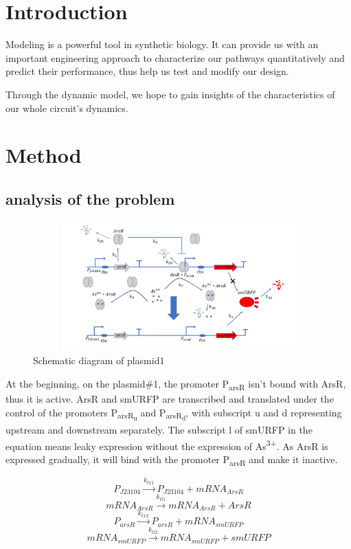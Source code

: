 \section{Introduction}
Modeling is a powerful tool in synthetic biology. It can provide us with an important engineering approach to characterize our pathways quantitatively and predict their performance, thus help us test and modify our design.

Through the dynamic model, we hope to gain insights of the characteristics of our whole circuit's dynamics.

\section{Method}
\subsection{analysis of the problem}
\begin{figure}[h]
\centering
\includegraphics[width=12cm,height=5cm]{1}
\caption{Schematic diagram of plasmid1}
\end{figure}

At the beginning, on the plasmid\#1, the promoter P\textsubscript{arsR} isn't bound with ArsR, thus it is active. ArsR and smURFP are transcribed and translated under the control of the promoters P\textsubscript{arsR\textsubscript{u}} and P\textsubscript{arsR\textsubscript{d}}, with subscript u and d representing upstream and downstream separately. The subscript l of smURFP in the equation means leaky expression without the expression of As\textsuperscript{3+}. As ArsR is expressed gradually, it will bind with the promoter P\textsubscript{arsR} and make it inactive. \cite{pola2018novel}

\begin{equation}
P_{J23104} \stackrel{k_{tx1}}{\longrightarrow} P_{J23104}+mRNA_{ArsR}
\end{equation}
\begin{equation}
mRNA_{ArsR}\stackrel{k_{tl1}}{\longrightarrow} mRNA_{ArsR}+ArsR
\end{equation}
\begin{equation}
P_{arsR} \stackrel{k_{tx2}}{\longrightarrow} P_{arsR} +mRNA_{smURFP}
\end{equation}
\begin{equation}
mRNA_{smURFP} \stackrel{k_{tl2}}{\longrightarrow} mRNA_{smURFP}+ smURFP
\end{equation}

